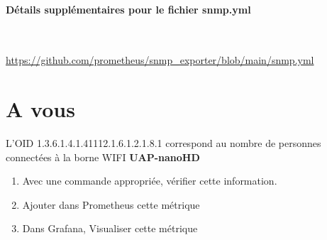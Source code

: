 \documentclass[french, 12pt]{article}%
\newif\ifPROF
\begin{document}
 
\paragraph{Détails supplémentaires pour le fichier snmp.yml} \  

\href{https://github.com/prometheus/snmp_exporter/blob/main/snmp.yml}{https://github.com/prometheus/snmp\_exporter/blob/main/snmp.yml}


\section{A vous}
L'OID 1.3.6.1.4.1.41112.1.6.1.2.1.8.1 correspond au nombre de personnes connectées à la borne WIFI \textbf{UAP-nanoHD}

\begin{enumerate}
\item Avec une commande appropriée, vérifier cette information. 
\item Ajouter dans Prometheus cette métrique
\item Dans Grafana, Visualiser cette métrique
\end{enumerate}

\ifPROF
\color{red}
\begin{lstlisting}[style=commande] 
snmpwalk -v2c -c public 192.168.1.73 1.3.6.1.4.1.41112.1.6.1.2.1.8.1
\end{lstlisting}
\normalcolor
\fi
\end{document}
